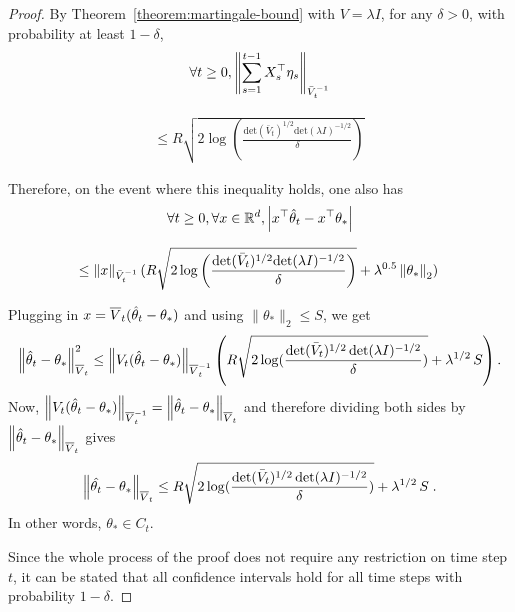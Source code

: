 \begin{proof}
By Theorem~\ref{theorem:martingale-bound} with $V=\lambda I$, for any $\delta > 0$, with probability at least $1-\delta$,
 \begin{align*}
  \forall t \geq 0, \left\|\sum_{s=1}^{t-1}{X_s^\top \mathbf{\eta}_s}\right\|_{\bar{V}_t^{-1}}
  \end{align*}

  \begin{align*}
  \leq R \sqrt{2 \log\left(\frac{\mathrm{det}(\bar{V}_t)^{1/2} \mathrm{det}(\lambda I)^{-1/2} }{\delta}\right)}\,
\end{align*}

Therefore, on the event where this inequality holds, one also has
\begin{align*}
  \forall t \ge 0, \forall x \in \mathbb{R}^d, \left|x^\top \hat{\mathbf{\theta}}_t - x^\top \theta_*\right|
  \end{align*}

  \begin{align*}
  \leq \left\|x\right\|_{\bar{V}_t^{-1}}(R \sqrt{2 \log\left(\frac{\mathrm{det}(\bar{V}_t)^{1/2} \mathrm{det}(\lambda I)^{-1/2} }{\delta}\right)} + \lambda^{0.5} \left\|\theta_*\right\|_2) \,
\end{align*}

Plugging in  $x = \overline{V}_{t}(\hat{\theta}_t - \theta_*)$ and using $\|\theta_*\|_2 \le S$, we get
\begin{equation}
\label{eq:cs1}
\left\|\hat{\theta}_t -  \theta_*\right\|_{\overline{V}_{t}}^2
\le
\left\|V_{t}(\hat{\theta}_t - \theta_*)\right\|_{\overline{V}_{t}^{-1}} \left( R \sqrt{2 \log( \frac{\det (\bar{V}_{t})^{1/2}\det(\lambda I)^{-1/2}}{\delta} )} + \lambda^{1/2}\, S\right).
\end{equation}
Now, $\left\|V_{t}(\hat{\theta}_t - \theta_*)\right\|_{\overline{V}_{t}^{-1}} = \left\|\hat{\theta}_t -  \theta_*\right\|_{\overline{V}_{t}}$ and therefore
dividing both sides by $\left\|\hat{\theta}_t -  \theta_*\right\|_{\overline{V}_{t}}$ gives
$$
\left\|\hat{\theta_t} -  \theta_*\right\|_{\overline{V}_{t}} \le R \sqrt{2 \log( \frac{\det (\bar{V}_{t})^{1/2}\det(\lambda I)^{-1/2}}{\delta} )} + \lambda^{1/2}\, S \; .
$$
In other words, $\theta_* \in C_t$.

Since the whole process of the proof does not require any restriction on time step $t$, it can be stated that
all confidence intervals hold for all time steps with probability $1-\delta$.
\end{proof}


